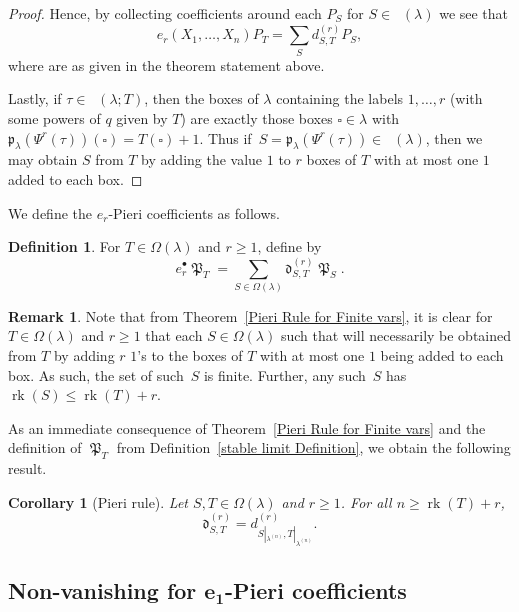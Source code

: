 \documentclass[pdftex]{sigma}
\numberwithin{equation}{section}
\newtheorem{Corollary}[Theorem]{Corollary}
\theoremstyle{definition}
\newtheorem{Definition}[Theorem]{Definition}
\newtheorem{Remark}[Theorem]{Remark}
\DeclareMathOperator{\PSYT}{\mathrm{PSYT}_{\geq 0}}
\DeclareMathOperator{\RSSYT}{\mathrm{RSSYT}_{\geq 0}}
\DeclareMathOperator{\MacD}{\mathfrak{P}}
\DeclareMathOperator{\rk}{\mathrm{rk}}
\begin{document}
\begin{proof}
 Hence, by collecting coefficients around each $P_S$ for $S \in \RSSYT(\lambda)$ we see that
 \[
 e_r(X_1,\dots, X_n)P_T = \sum_{S} d^{(r)}_{S,T} P_{S},
 \]
 where  are as given in the theorem statement above.

 Lastly, if $\tau \in \PSYT(\lambda;T)$, then the boxes of $\lambda$ containing the labels $1,\dots, r$ (with some powers of $q$ given by $T$) are exactly those boxes $\square \in \lambda$ with $\mathfrak{p}_{\lambda}(\Psi^r(\tau))(\square) = T(\square) +1$. Thus if~${S= \mathfrak{p}_{\lambda}(\Psi^r(\tau)) \in \RSSYT(\lambda)}$, then we may obtain $S$ from $T$ by adding the value $1$ to $r$ boxes of $T$ with at most one $1$ added to each box.
\end{proof}

We define the $e_r$-Pieri coefficients as follows.

\begin{Definition}\label{Pieri coeff Definition}
 For $T \in \Omega(\lambda)$ and $r \geq 1$, define  by
 \[
 e_r^{\bullet}\MacD_T = \sum_{S \in \Omega(\lambda)} \mathfrak{d}^{(r)}_{S,T} \MacD_{S}.
 \]

\end{Definition}

\begin{Remark}
 Note that from Theorem~\ref{Pieri Rule for Finite vars}, it is clear for $T \in \Omega(\lambda)$ and $ r\geq 1$ that each $S \in \Omega(\lambda)$ such that  will necessarily be obtained from $T$ by adding $r$ $1$'s to the boxes of $T$ with at most one $1$ being added to each box. As such, the set of such~$S$ is finite. Further, any such~$S$ has $\rk(S) \leq \rk(T) + r$.
\end{Remark}

As an immediate consequence of Theorem~\ref{Pieri Rule for Finite vars} and the definition of $\MacD_{T}$ from Definition~\ref{stable limit Definition}, we obtain the following result.

\begin{Corollary}[Pieri rule]\label{Pieri Rule}
 Let $S,T \in \Omega(\lambda)$ and $r \geq 1$. For all $n \geq \rk(T)+r$,
 \[
 \mathfrak{d}^{(r)}_{S,T} = d^{(r)}_{S|_{\lambda^{(n)}},T|_{\lambda^{(n)}}}.
 \]

\end{Corollary}


\subsection[Non-vanishing for e\_1-Pieri coefficients]{Non-vanishing for $\boldsymbol{e_1}$-Pieri coefficients}
\end{document}
